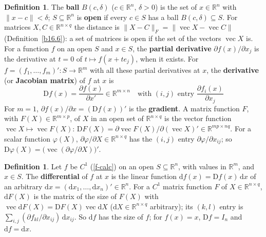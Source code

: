 \documentclass[12pt]{article}
\newcommand{\R}{\mathbb R}
\theoremstyle{definition}
\newtheorem{definition}[theorem]{Definition}
\DeclareMathOperator{\vecop}{vec}
\begin{document}
\begin{definition}\label{b16.17}
The \textbf{ball} \(B(c,\delta)\) (\(c\in\R^n\), \(\delta>0\)) is the set of \(x\in\R^n\) with
\(\lVert x-c\rVert<\delta\); \(S\subseteq\R^n\) is \textbf{open} if every \(c\in S\) has a ball \(B(c,\delta)\subseteq
S\). For matrices \(X,C\in\R^{n\times q}\) the distance is \(\lVert X-C\rVert_F=\lVert\vecop X-\vecop C\rVert\)
(Definition~\ref{b16.6}): a set of matrices is open if the set of the vectors \(\vecop X\) is. For a function \(f\) on an
open \(S\) and \(x\in S\), the \textbf{partial derivative} \(\partial f(x)/\partial x_j\) is the derivative at \(t=0\) of
\(t\mapsto f(x+te_j)\), when it exists. For \(f=(f_1,\dots,f_m)':S\to\R^m\) with all these partial derivatives at \(x\),
the \textbf{derivative} (or \textbf{Jacobian matrix}) of \(f\) at \(x\) is
\[
\mathrm Df(x)=\frac{\partial f(x)}{\partial x'}\in\R^{m\times n}\quad\text{with }(i,j)\text{ entry }
\frac{\partial f_i(x)}{\partial x_j}
\]
For \(m=1\), \(\partial f(x)/\partial x=(\mathrm Df(x))'\) is the \textbf{gradient}. A matrix function \(F\), with
\(F(X)\in\R^{m\times p}\), of \(X\) in an open set of \(\R^{n\times q}\) is the vector function
\(\vecop X\mapsto\vecop F(X)\): \(\mathrm DF(X)=\partial\vecop F(X)/\partial(\vecop X)'\in\R^{mp\times nq}\). For a
scalar function \(\varphi(X)\), \(\partial\varphi/\partial X\in\R^{n\times q}\) has the \((i,j)\) entry
\(\partial\varphi/\partial x_{ij}\); so \(\mathrm D\varphi(X)=\bigl(\vecop(\partial\varphi/\partial X)\bigr)'\).
\end{definition}

\begin{definition}\label{b16.20}
Let \(f\) be \(C^1\) (\ref{f-calc}) on an open \(S\subseteq\R^n\), with values in \(\R^m\), and \(x\in S\). The
\textbf{differential} of \(f\) at \(x\) is the linear function \(\mathrm{d}f(x)=\mathrm Df(x)\,\mathrm{d}x\) of an
arbitrary \(\mathrm{d}x=(\mathrm{d}x_1,\dots,\mathrm{d}x_n)'\in\R^n\). For a \(C^1\) matrix function \(F\) of
\(X\in\R^{n\times q}\), \(\mathrm{d}F(X)\) is the matrix of the size of \(F(X)\) with
\(\vecop\mathrm{d}F(X)=\mathrm DF(X)\vecop\mathrm{d}X\) (\(\mathrm{d}X\in\R^{n\times q}\) arbitrary); its \((k,l)\)
entry is \(\sum_{i,j}(\partial f_{kl}/\partial x_{ij})\,\mathrm{d}x_{ij}\). So \(\mathrm{d}f\) has the size of \(f\);
for \(f(x)=x\), \(\mathrm Df=I_n\) and \(\mathrm{d}f=\mathrm{d}x\).
\end{definition}
\end{document}
